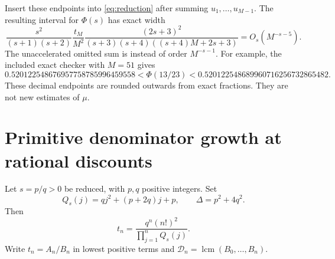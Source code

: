 \documentclass[11pt]{article}
\theoremstyle{remark}
\DeclareMathOperator{\lcm}{lcm}
\begin{document}
Insert these endpoints into \eqref{eq:reduction} after summing
$u_1,\ldots,u_{M-1}$. The resulting interval for $\Phi(s)$ has exact
width
\begin{equation}\label{eq:phi-width}
 \frac{s^2}{(s+1)(s+2)}\frac{t_M}{M^2}
 \frac{(2s+3)^2}{(s+3)(s+4)((s+4)M+2s+3)}
 =O_s(M^{-s-5}).
\end{equation}
The unaccelerated omitted sum is instead of order $M^{-s-1}$.
For example, the included exact checker with $M=51$ gives
\[
 0.520122548676957758785996459558
 <\Phi(13/23)<
 0.520122548689960716256732865482.
\]
These decimal endpoints are rounded outwards from exact fractions.
They are not new estimates of $\mu$.

\section{Primitive denominator growth at rational discounts}

Let $s=p/q>0$ be reduced, with $p,q$ positive integers. Set
\begin{equation}\label{eq:quadratic}
 Q_s(j)=qj^2+(p+2q)j+p,\qquad \Delta=p^2+4q^2.
\end{equation}
Then
\[
 t_n=\frac{q^n(n!)^2}{\prod_{j=1}^n Q_s(j)}.
\]
Write $t_n=A_n/B_n$ in lowest positive terms and
$\mathcal D_n=\lcm(B_0,\ldots,B_n)$.
\end{document}
